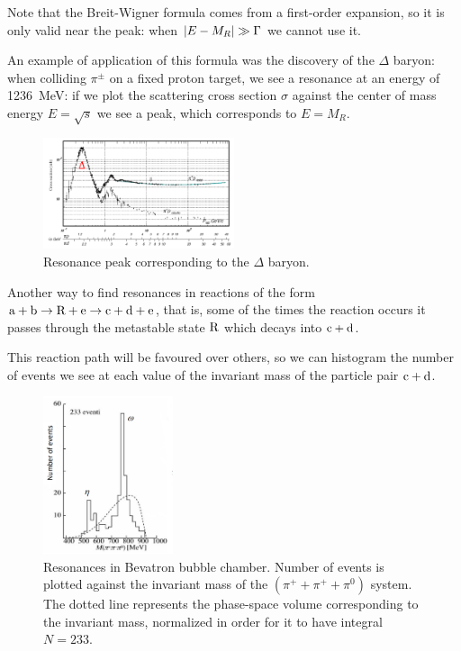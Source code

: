 \documentclass[10pt]{article}
\begin{document}
Note that the Breit-Wigner formula comes from a first-order expansion, so it is only valid near the peak: when \(\abs{E-M_R} \gg \Gamma \) we cannot use it.

An example of application of this formula was the discovery of the \(\Delta\) baryon: when colliding \(\pi^{\pm}\) on a fixed proton target, we see a resonance at an energy of \SI{1236}{MeV}: if we plot the scattering cross section \(\sigma\) against the center of mass energy \(E = \sqrt{s} \) we see a peak, which corresponds to \(E = M_R\).

\begin{figure}[H]
    \centering
    \includegraphics[width=0.5\textwidth]{breit-wigner.png}
    \caption{Resonance peak corresponding to the \(\Delta\) baryon.}
    \label{fig:delta-baryon}
\end{figure}

Another way to find resonances in reactions of the form \(\ce{a} + \ce{b} \rightarrow \ce{R} + \ce{e} \rightarrow \ce{c} + \ce{d} + \ce{e} \), that is, some of the times the reaction occurs it passes through the metastable state \(\ce{R} \) which decays into \(\ce{c} + \ce{d}\).

This reaction path will be favoured over others, so we can histogram the number of events we see at each value of the invariant mass of the particle pair \(\ce{c} + \ce{d}\).

\begin{figure}
    \center
    \includegraphics[width=0.34\textwidth]{eta.png}
    \caption{Resonances in Bevatron bubble chamber. Number of events is plotted against the invariant mass of the \((\pi^+ + \pi^+ + \pi^0)\) system. The dotted line represents the phase-space volume corresponding to the invariant mass, normalized in order for it to have integral \(N=233\).}
    \label{fig:bevatron}
\end{figure}
\end{document}
